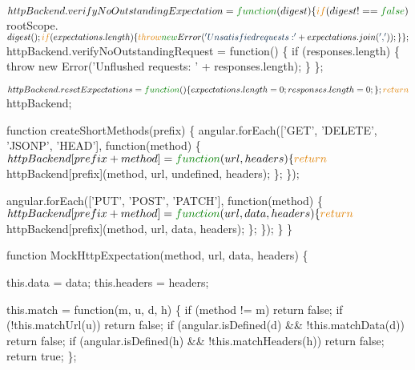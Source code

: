 \begin{DoxyCodeInclude}
  $httpBackend.verifyNoOutstandingExpectation = \textcolor{keyword}{function}(digest) \{
    \textcolor{keywordflow}{if} (digest !== \textcolor{keyword}{false}) $rootScope.$digest();
    \textcolor{keywordflow}{if} (expectations.length) \{
      \textcolor{keywordflow}{throw} \textcolor{keyword}{new} Error(\textcolor{stringliteral}{'Unsatisfied requests: '} + expectations.join(\textcolor{stringliteral}{', '}));
    \}
  \};


  $httpBackend.verifyNoOutstandingRequest = \textcolor{keyword}{function}() \{
    \textcolor{keywordflow}{if} (responses.length) \{
      \textcolor{keywordflow}{throw} \textcolor{keyword}{new} Error(\textcolor{stringliteral}{'Unflushed requests: '} + responses.length);
    \}
  \};


  $httpBackend.resetExpectations = \textcolor{keyword}{function}() \{
    expectations.length = 0;
    responses.length = 0;
  \};

  \textcolor{keywordflow}{return} $httpBackend;


  \textcolor{keyword}{function} createShortMethods(prefix) \{
    angular.forEach([\textcolor{stringliteral}{'GET'}, \textcolor{stringliteral}{'DELETE'}, \textcolor{stringliteral}{'JSONP'}, \textcolor{stringliteral}{'HEAD'}], \textcolor{keyword}{function}(method) \{
     $httpBackend[prefix + method] = \textcolor{keyword}{function}(url, headers) \{
       \textcolor{keywordflow}{return} $httpBackend[prefix](method, url, undefined, headers);
     \};
    \});

    angular.forEach([\textcolor{stringliteral}{'PUT'}, \textcolor{stringliteral}{'POST'}, \textcolor{stringliteral}{'PATCH'}], \textcolor{keyword}{function}(method) \{
      $httpBackend[prefix + method] = \textcolor{keyword}{function}(url, data, headers) \{
        \textcolor{keywordflow}{return} $httpBackend[prefix](method, url, data, headers);
      \};
    \});
  \}
\}

\textcolor{keyword}{function} MockHttpExpectation(method, url, data, headers) \{

  this.data = data;
  this.headers = headers;

  this.match = \textcolor{keyword}{function}(m, u, d, h) \{
    \textcolor{keywordflow}{if} (method != m) \textcolor{keywordflow}{return} \textcolor{keyword}{false};
    \textcolor{keywordflow}{if} (!this.matchUrl(u)) \textcolor{keywordflow}{return} \textcolor{keyword}{false};
    \textcolor{keywordflow}{if} (angular.isDefined(d) && !this.matchData(d)) \textcolor{keywordflow}{return} \textcolor{keyword}{false};
    \textcolor{keywordflow}{if} (angular.isDefined(h) && !this.matchHeaders(h)) \textcolor{keywordflow}{return} \textcolor{keyword}{false};
    \textcolor{keywordflow}{return} \textcolor{keyword}{true};
  \};


\end{DoxyCodeInclude}
